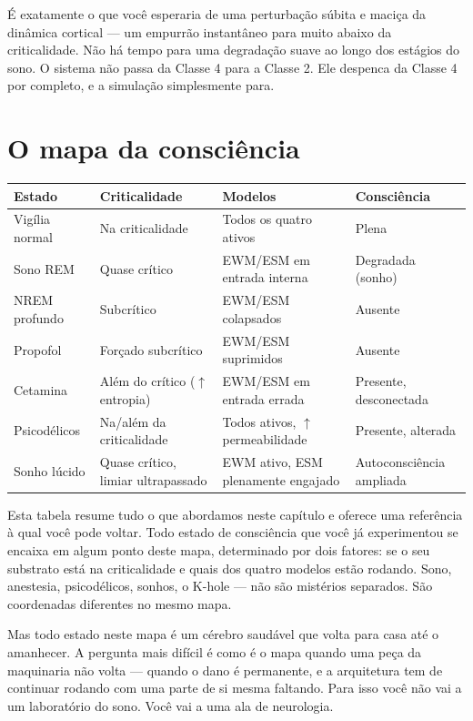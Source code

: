 \documentclass[11pt, twoside, openright]{book}
\begin{document}
É exatamente o que você esperaria de uma perturbação súbita e maciça da dinâmica cortical --- um empurrão instantâneo para muito abaixo da criticalidade. Não há tempo para uma degradação suave ao longo dos estágios do sono. O sistema não passa da Classe 4 para a Classe 2. Ele despenca da Classe 4 por completo, e a simulação simplesmente para.

\section*{O mapa da consciência}


\small
\begin{xltabular}{\linewidth}{X X X X}
\toprule
\textbf{Estado} & \textbf{Criticalidade} & \textbf{Modelos} & \textbf{Consciência} \\
\midrule\endhead
Vigília normal & Na criticalidade & Todos os quatro ativos & Plena \\[4pt]
Sono REM & Quase crítico & EWM/\allowbreak{}ESM em entrada interna & Degradada (sonho) \\[4pt]
NREM profundo & Subcrítico & EWM/\allowbreak{}ESM colapsados & Ausente \\[4pt]
Propofol & Forçado subcrítico & EWM/\allowbreak{}ESM suprimidos & Ausente \\[4pt]
Cetamina & Além do crítico ($\uparrow$ entropia) & EWM/\allowbreak{}ESM em entrada errada & Presente, desconectada \\[4pt]
Psicodélicos & Na/\allowbreak{}além da criticalidade & Todos ativos, $\uparrow$ permeabilidade & Presente, alterada \\[4pt]
Sonho lúcido & Quase crítico, limiar ultrapassado & EWM ativo, ESM plenamente engajado & Autoconsciência ampliada \\[4pt]
\bottomrule
\end{xltabular}
\normalsize


Esta tabela resume tudo o que abordamos neste capítulo e oferece uma referência à qual você pode voltar. Todo estado de consciência que você já experimentou se encaixa em algum ponto deste mapa, determinado por dois fatores: se o seu substrato está na criticalidade e quais dos quatro modelos estão rodando. Sono, anestesia, psicodélicos, sonhos, o K-hole --- não são mistérios separados. São coordenadas diferentes no mesmo mapa.

Mas todo estado neste mapa é um cérebro saudável que volta para casa até o amanhecer. A pergunta mais difícil é como é o mapa quando uma peça da maquinaria não volta --- quando o dano é permanente, e a arquitetura tem de continuar rodando com uma parte de si mesma faltando. Para isso você não vai a um laboratório do sono. Você vai a uma ala de neurologia.
\end{document}
